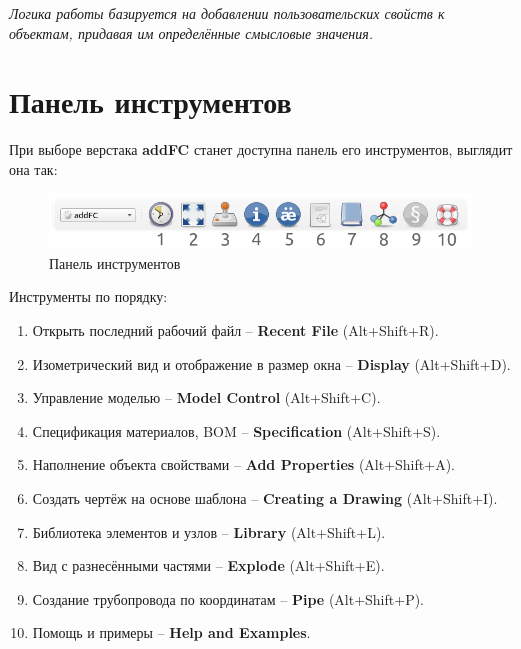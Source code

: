 \documentclass[a4paper,12pt]{article}
\begin{document}
\begin{center}\emph{Логика работы базируется на добавлении пользовательских свойств к объектам, придавая им определённые смысловые значения.}\end{center}




\section{Панель инструментов}

При выборе верстака \textbf{addFC} станет доступна панель его инструментов, выглядит она так:

\begin{figure}[htp]
	\centering
	\includegraphics[scale=0.8]{img/toolbar.png}
	\caption{Панель инструментов}
	\label{sec:toolbar}
\end{figure}

\begin{flushleft}Инструменты по порядку:\end{flushleft}
\begin{enumerate}
	\item Открыть последний рабочий файл -- \textbf{Recent File} (Alt+Shift+R).\label{sec:1}
	\item Изометрический вид и отображение в размер окна -- \textbf{Display} (Alt+Shift+D).\label{sec:2}
	\item Управление моделью -- \textbf{Model Control} (Alt+Shift+C).\label{sec:3}
	\item Спецификация материалов, BOM -- \textbf{Specification} (Alt+Shift+S).\label{sec:4}
	\item Наполнение объекта свойствами -- \textbf{Add Properties} (Alt+Shift+A).\label{sec:5}
	\item Создать чертёж на основе шаблона -- \textbf{Creating a Drawing} (Alt+Shift+I).\label{sec:6}
	\item Библиотека элементов и узлов -- \textbf{Library} (Alt+Shift+L).\label{sec:7}
    \item Вид с разнесёнными частями -- \textbf{Explode} (Alt+Shift+E).\label{sec:8}
	\item Создание трубопровода по координатам -- \textbf{Pipe} (Alt+Shift+P).\label{sec:9}
    \item Помощь и примеры -- \textbf{Help and Examples}.\label{sec:10}
\end{enumerate}
\end{document}
